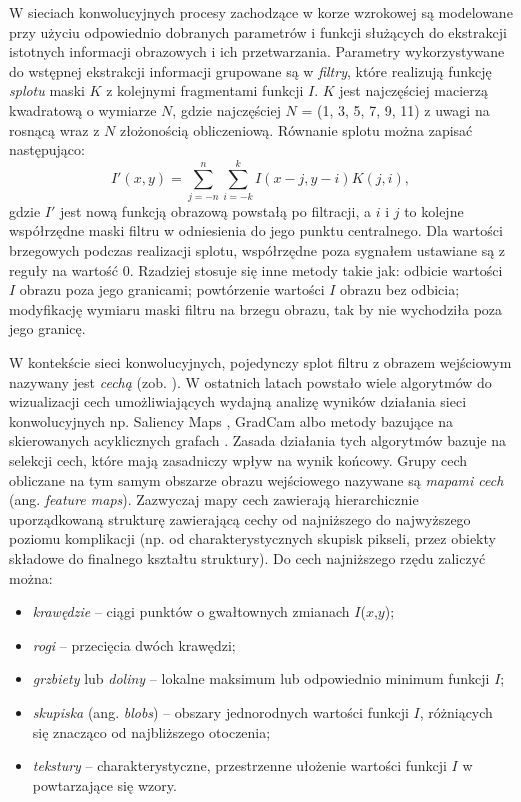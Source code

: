 W sieciach konwolucyjnych procesy zachodzące w korze wzrokowej są modelowane przy użyciu odpowiednio dobranych parametrów i funkcji służących do ekstrakcji istotnych informacji obrazowych i ich przetwarzania.  Parametry wykorzystywane do wstępnej ekstrakcji informacji grupowane są w \textit{filtry}, które realizują funkcję \textit{splotu} maski $K$ z kolejnymi fragmentami funkcji $I$. $K$ jest najczęściej macierzą kwadratową o wymiarze $N$, gdzie najczęściej $N$ = (1, 3, 5, 7, 9, 11) z uwagi na rosnącą wraz z $N$ złożonością obliczeniową. Równanie splotu można zapisać następująco:
\begin{equation}
	I'\left(x, y\right) = \sum_{j=-n}^{n} \sum_{i=-k}^{k} I\left(x - j, y - i \right)K\left(j, i\right),
\end{equation}
gdzie $I'$ jest nową funkcją obrazową powstałą po filtracji, a $i$ i $j$ to kolejne współrzędne maski filtru w odniesienia do jego punktu centralnego. Dla wartości brzegowych podczas realizacji splotu, współrzędne poza sygnałem ustawiane są z reguły na wartość 0. Rzadziej stosuje się inne metody takie jak: odbicie wartości $I$ obrazu poza jego granicami; powtórzenie wartości $I$ obrazu bez odbicia; modyfikację wymiaru maski filtru na brzegu obrazu, tak by nie wychodziła poza jego granicę.

W kontekście sieci konwolucyjnych, pojedynczy splot filtru z obrazem wejściowym nazywany jest \textit{cechą} (zob. \cite{Hijazi2015}). W ostatnich latach powstało wiele algorytmów do wizualizacji cech umożliwiających wydajną analizę wyników działania sieci konwolucyjnych np. Saliency Maps \cite{DBLP:journals/corr/SimonyanVZ13}, GradCam \cite{DBLP:journals/corr/SelvarajuDVCPB16} albo metody bazujące na skierowanych acyklicznych grafach \cite{DBLP:journals/corr/LiuSLLZL16}. Zasada działania tych algorytmów bazuje na selekcji cech, które mają zasadniczy wpływ na wynik końcowy. Grupy cech obliczane na tym samym obszarze obrazu wejściowego nazywane są \textit{mapami cech} (ang. \textit{feature maps}). Zazwyczaj mapy cech zawierają hierarchicznie uporządkowaną strukturę zawierającą cechy od najniższego do najwyższego poziomu komplikacji (np. od charakterystycznych skupisk pikseli, przez obiekty składowe do finalnego kształtu struktury). Do cech najniższego rzędu zaliczyć można:
\begin{itemize}
	\item \textit{krawędzie} -- ciągi punktów o gwałtownych zmianach $I$($x$,$y$);
	\item \textit{rogi} -- przecięcia dwóch krawędzi;
	\item \textit{grzbiety} lub \textit{doliny} -- lokalne maksimum lub odpowiednio minimum funkcji $I$;
	\item \textit{skupiska} (ang. \textit{blobs}) -- obszary jednorodnych wartości funkcji $I$, różniących się znacząco od najbliższego otoczenia; 
	\item \textit{tekstury} -- charakterystyczne, przestrzenne ułożenie wartości funkcji $I$ w powtarzające się wzory.
\end{itemize}


